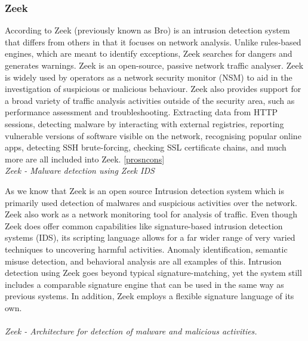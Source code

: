 \subsubsection{Zeek}

According to \cite{strand_2022} Zeek (previously known as Bro) is an intrusion detection system that differs from others in that it focuses on network analysis. Unlike rules-based engines, which are meant to identify exceptions, Zeek searches for dangers and generates warnings. Zeek is an open-source, passive network traffic analyser. Zeek is widely used by operators as a network security monitor (NSM) \cite{electronics11050679} to aid in the investigation of suspicious or malicious behaviour. Zeek also provides support for a broad variety of traffic analysis activities outside of the security area, such as performance assessment and troubleshooting.
Extracting data from HTTP sessions, detecting malware by interacting with external registries, reporting vulnerable versions of software visible on the network, recognising popular online apps, detecting SSH brute-forcing, checking SSL certificate chains, and much more are all included into Zeek. \ref{prosncons}\\

\textit{Zeek - Malware detection using Zeek IDS}

As we know that Zeek is an open source Intrusion detection system which is primarily used detection of malwares and suspicious activities over the network. Zeek also work as a network monitoring tool for analysis of traffic. Even though Zeek does offer common capabilities like signature-based intrusion detection systems (IDS), its scripting language allows for a far wider range of very varied techniques to uncovering harmful activities. Anomaly identification, semantic misuse detection, and behavioral analysis are all examples of this. Intrusion detection using Zeek goes beyond typical signature-matching, yet the system still includes a comparable signature engine that can be used in the same way as previous systems. In addition, Zeek employs a flexible signature language of its own.\\
\\
\textit{Zeek - Architecture for detection of malware and malicious activities.}

